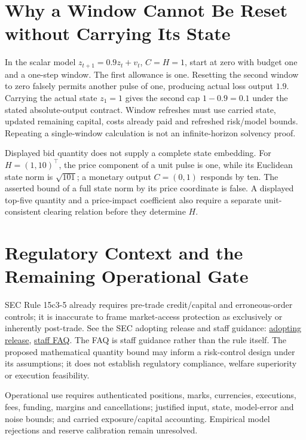 \documentclass[11pt]{article}
\begin{document}
\section{Why a Window Cannot Be Reset without Carrying Its State}
In the scalar model $z_{t+1}=0.9z_t+v_t$, $C=H=1$, start at zero with budget one and a one-step window. The first allowance is one. Resetting the second window to zero falsely permits another pulse of one, producing actual loss output $1.9$. Carrying the actual state $z_1=1$ gives the second cap $1-0.9=0.1$ under the stated absolute-output contract. Window refreshes must use carried state, updated remaining capital, costs already paid and refreshed risk/model bounds. Repeating a single-window calculation is not an infinite-horizon solvency proof.

Displayed bid quantity does not supply a complete state embedding. For $H=(1,10)^\top$, the price component of a unit pulse is one, while its Euclidean state norm is $\sqrt{101}$; a monetary output $C=(0,1)$ responds by ten. The asserted bound of a full state norm by its price coordinate is false. A displayed top-five quantity and a price-impact coefficient also require a separate unit-consistent clearing relation before they determine $H$.

\section{Regulatory Context and the Remaining Operational Gate}
SEC Rule 15c3-5 already requires pre-trade credit/capital and erroneous-order controls; it is inaccurate to frame market-access protection as exclusively or inherently post-trade. See the SEC adopting release and staff guidance: \href{https://www.sec.gov/rules/final/2010/34-63241.pdf}{adopting release}, \href{https://www.sec.gov/rules-regulations/staff-guidance/trading-markets-frequently-asked-questions/divisionsmarketregfaq-0}{staff FAQ}. The FAQ is staff guidance rather than the rule itself. The proposed mathematical quantity bound may inform a risk-control design under its assumptions; it does not establish regulatory compliance, welfare superiority or execution feasibility.

Operational use requires authenticated positions, marks, currencies, executions, fees, funding, margins and cancellations; justified input, state, model-error and noise bounds; and carried exposure/capital accounting. Empirical model rejections and reserve calibration remain unresolved.
\end{document}

